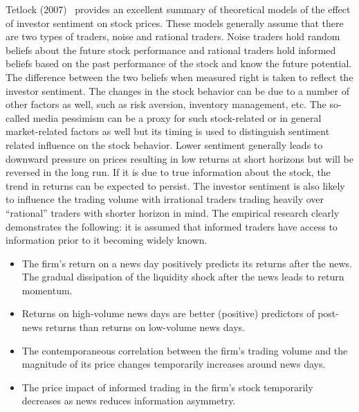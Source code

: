  
 Tetlock (2007)~\cite{tetlock2007giving} provides an excellent summary of theoretical models of the effect of investor sentiment on stock prices. These models generally assume that there are two types of traders, noise and rational traders. Noise traders hold random beliefs about the future stock performance and rational traders hold informed beliefs based on the past performance of the stock and know the future potential. The difference between the two beliefs when measured right is taken to reflect the investor sentiment. The changes in the stock behavior can be due to a number of other factors as well, such as risk aversion, inventory management, etc. The so-called media pessimism can be a proxy for such stock-related or in general market-related factors as well but its timing is used to distinguish sentiment related influence on the stock behavior. Lower sentiment generally leads to downward pressure on prices resulting in low returns at short horizons but will be reversed in the long run. If it is due to true information about the stock, the trend in returns can be expected to persist. The investor sentiment is also likely to influence the trading volume with irrational traders trading heavily over ``rational'' traders with shorter horizon in mind. The empirical research clearly demonstrates the following: it is assumed that informed traders have access to information prior to it becoming widely known.
 	\begin{itemize}
	\item The firm's return on a news day positively predicts its returns after the news. The gradual dissipation of the liquidity shock after the news leads to return momentum.
	\item Returns on high-volume news days are better (positive) predictors of post-news returns than returns on low-volume news days.
	\item The contemporaneous correlation between the firm's trading volume and the magnitude of its price changes temporarily increases around news days.
	\item The price impact of informed trading in the firm's stock temporarily decreases as news reduces information asymmetry. 
	\end{itemize}
 
